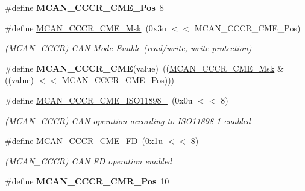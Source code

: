 \begin{DoxyCompactItemize}
\#define {\bfseries M\+C\+A\+N\+\_\+\+C\+C\+C\+R\+\_\+\+C\+M\+E\+\_\+\+Pos}~8
\item 
\mbox{\label{group__SAMV71__MCAN_ga101af3cbe56bc9cf8bad6cc04301f10d}} 
\#define \mbox{\hyperlink{group__SAMV71__MCAN_ga101af3cbe56bc9cf8bad6cc04301f10d}{M\+C\+A\+N\+\_\+\+C\+C\+C\+R\+\_\+\+C\+M\+E\+\_\+\+Msk}}~(0x3u $<$$<$ M\+C\+A\+N\+\_\+\+C\+C\+C\+R\+\_\+\+C\+M\+E\+\_\+\+Pos)
\begin{DoxyCompactList}\small\item\em (M\+C\+A\+N\+\_\+\+C\+C\+CR) C\+AN Mode Enable (read/write, write protection) \end{DoxyCompactList}\item 
\mbox{\label{group__SAMV71__MCAN_ga10ecca0cd9635bb3dbc42aa6c050608d}} 
\#define {\bfseries M\+C\+A\+N\+\_\+\+C\+C\+C\+R\+\_\+\+C\+ME}(value)~((\mbox{\hyperlink{group__SAMV71__MCAN_ga101af3cbe56bc9cf8bad6cc04301f10d}{M\+C\+A\+N\+\_\+\+C\+C\+C\+R\+\_\+\+C\+M\+E\+\_\+\+Msk}} \& ((value) $<$$<$ M\+C\+A\+N\+\_\+\+C\+C\+C\+R\+\_\+\+C\+M\+E\+\_\+\+Pos)))
\item 
\mbox{\label{group__SAMV71__MCAN_gadac4c5f8dd13bf01ba7136e48eae97d0}} 
\#define \mbox{\hyperlink{group__SAMV71__MCAN_gadac4c5f8dd13bf01ba7136e48eae97d0}{M\+C\+A\+N\+\_\+\+C\+C\+C\+R\+\_\+\+C\+M\+E\+\_\+\+I\+S\+O11898\+\_}}~(0x0u $<$$<$ 8)
\begin{DoxyCompactList}\small\item\em (M\+C\+A\+N\+\_\+\+C\+C\+CR) C\+AN operation according to I\+S\+O11898-\/1 enabled \end{DoxyCompactList}\item 
\mbox{\label{group__SAMV71__MCAN_gacaf295bcefa3292a8c073d38349305ae}} 
\#define \mbox{\hyperlink{group__SAMV71__MCAN_gacaf295bcefa3292a8c073d38349305ae}{M\+C\+A\+N\+\_\+\+C\+C\+C\+R\+\_\+\+C\+M\+E\+\_\+\+FD}}~(0x1u $<$$<$ 8)
\begin{DoxyCompactList}\small\item\em (M\+C\+A\+N\+\_\+\+C\+C\+CR) C\+AN FD operation enabled \end{DoxyCompactList}\item 
\mbox{\label{group__SAMV71__MCAN_ga7ad8298249fb9b4963440bdeddf29571}} 
\#define {\bfseries M\+C\+A\+N\+\_\+\+C\+C\+C\+R\+\_\+\+C\+M\+R\+\_\+\+Pos}~10

\end{DoxyCompactItemize}
